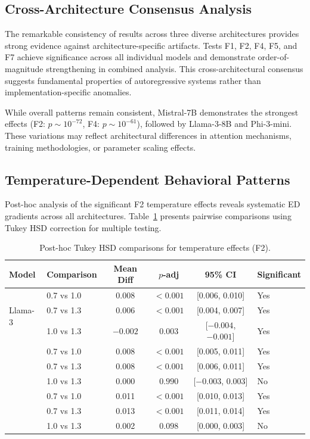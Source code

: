 \documentclass[12pt]{article}
\begin{document}
\subsection{Cross-Architecture Consensus Analysis}

The remarkable consistency of results across three diverse architectures provides strong evidence against architecture-specific artifacts. Tests F1, F2, F4, F5, and F7 achieve significance across all individual models and demonstrate order-of-magnitude strengthening in combined analysis. This cross-architectural consensus suggests fundamental properties of autoregressive systems rather than implementation-specific anomalies.

While overall patterns remain consistent, Mistral-7B demonstrates the strongest effects (F2: $p \sim 10^{-72}$, F4: $p \sim 10^{-61}$), followed by Llama-3-8B and Phi-3-mini. These variations may reflect architectural differences in attention mechanisms, training methodologies, or parameter scaling effects.

\subsection{Temperature-Dependent Behavioral Patterns}

Post-hoc analysis of the significant F2 temperature effects reveals systematic ED gradients across all architectures. Table~\ref{tab:temp_posthoc} presents pairwise comparisons using Tukey HSD correction for multiple testing.

\begin{table}[H]
\centering
\small
\begin{tabular}{llcccl}
\toprule
Model & Comparison & Mean Diff & $p$-adj & 95\% CI & Significant \\
\midrule
\multirow{3}{*}{Llama-3} & 0.7 vs 1.0 & 0.008 & $< 0.001$ & [0.006, 0.010] & Yes \\
 & 0.7 vs 1.3 & 0.006 & $< 0.001$ & [0.004, 0.007] & Yes \\
 & 1.0 vs 1.3 & $-0.002$ & $0.003$ & [$-0.004$, $-0.001$] & Yes \\
\addlinespace
\multirow{3}{*}{Phi-3} & 0.7 vs 1.0 & 0.008 & $< 0.001$ & [0.005, 0.011] & Yes \\
 & 0.7 vs 1.3 & 0.008 & $< 0.001$ & [0.006, 0.011] & Yes \\
 & 1.0 vs 1.3 & 0.000 & $0.990$ & [$-0.003$, 0.003] & No \\
\addlinespace
\multirow{3}{*}{Mistral} & 0.7 vs 1.0 & 0.011 & $< 0.001$ & [0.010, 0.013] & Yes \\
 & 0.7 vs 1.3 & 0.013 & $< 0.001$ & [0.011, 0.014] & Yes \\
 & 1.0 vs 1.3 & 0.002 & $0.098$ & [0.000, 0.003] & No \\
\bottomrule
\end{tabular}
\caption{Post-hoc Tukey HSD comparisons for temperature effects (F2).}
\label{tab:temp_posthoc}
\end{table}
\end{document}
